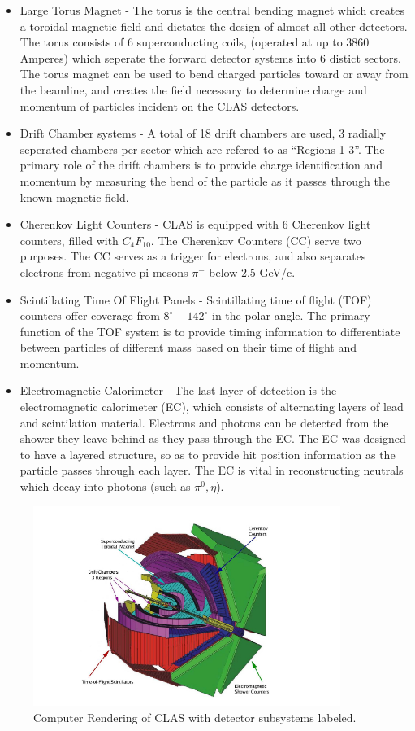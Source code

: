 \begin{itemize}
\item Large Torus Magnet - The torus is the central bending magnet which creates a toroidal magnetic field and dictates the design of almost all other detectors.  The torus consists of 6 superconducting coils, (operated at up to 3860 Amperes) which seperate the forward detector systems into 6 distict sectors.  The torus magnet can be used to bend charged particles toward or away from the beamline, and creates the field necessary to determine charge and momentum of particles incident on the CLAS detectors.  
\item Drift Chamber systems - A total of 18 drift chambers are used, 3 radially seperated chambers per sector which are refered to as ``Regions 1-3''.  The primary role of the drift chambers is to provide charge identification and momentum by measuring the bend of the particle as it passes through the known magnetic field.    
\item Cherenkov Light Counters - CLAS is equipped with 6 Cherenkov light counters, filled with $C_{4} F_{10}$.  The Cherenkov Counters (CC) serve two purposes.  The CC serves as a trigger for electrons, and also separates electrons from negative pi-mesons $\pi^{-}$ below 2.5 GeV/c.
\item Scintillating Time Of Flight Panels - Scintillating time of flight (TOF) counters offer coverage from $8^{\circ} - 142^{\circ}$ in the polar angle.  The primary function of the TOF system is to provide timing information to differentiate between particles of different mass based on their time of flight and momentum.  
\item Electromagnetic Calorimeter - The last layer of detection is the electromagnetic calorimeter (EC), which consists of alternating layers of lead and scintilation material.  Electrons and photons can be detected from the shower they leave behind as they pass through the EC.  The EC was designed to have a layered structure, so as to provide hit position information as the particle passes through each layer.  The EC is vital in reconstructing neutrals which decay into photons (such as $\pi^0, \eta$). 
\end{itemize}

\begin{figure}
  \centering
  \includegraphics[width=10cm]{image/clas.png}
  \caption{ Computer Rendering of CLAS with detector subsystems labeled.}
  \label{fig:clas}
\end{figure}

